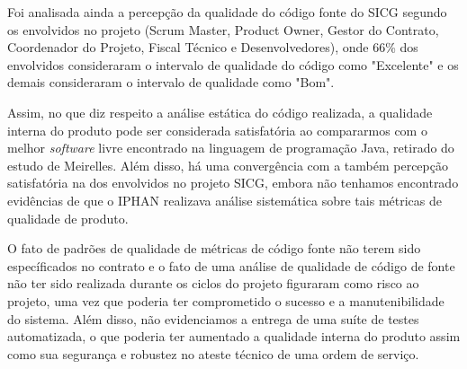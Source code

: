 Foi analisada ainda a percepção da qualidade do código fonte do SICG segundo os envolvidos no projeto (Scrum Master, Product Owner, Gestor do Contrato, Coordenador do Projeto, Fiscal Técnico e Desenvolvedores), onde 66\% dos envolvidos consideraram  o intervalo de qualidade do código como "Excelente" e os demais consideraram
o intervalo de qualidade como "Bom".

Assim, no que diz respeito a análise estática do código realizada, a qualidade interna do produto pode ser considerada satisfatória ao compararmos com o melhor \textit{software} livre encontrado na linguagem de programação Java, retirado do estudo de Meirelles. Além disso, há uma convergência com a também percepção satisfatória na dos envolvidos no projeto SICG, embora não tenhamos encontrado evidências de que o IPHAN realizava análise sistemática sobre tais métricas de qualidade de produto.

O fato de padrões de qualidade de métricas de código fonte não terem sido específicados no contrato e o fato de uma análise de qualidade de código de fonte não ter sido realizada durante os ciclos do projeto figuraram como risco ao projeto, uma vez que poderia ter comprometido o sucesso e a manutenibilidade do sistema. Além disso, não evidenciamos a entrega de uma suíte de testes automatizada, o que poderia ter aumentado a qualidade interna do produto assim como sua segurança e robustez no ateste técnico de uma ordem de serviço.